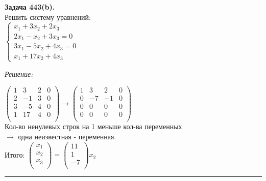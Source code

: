\documentclass[a4paper, 12pt]{article}
\newenvironment{problem}[2][Задача]
{ \begin{mdframed}[backgroundcolor=gray!10] \textbf{#1 #2.} \\}
{  \end{mdframed}}
\newenvironment{solution}
{\textit{Решение: }}
{\noindent\rule{7in}{1.5pt}}
\begin{document}
\begin{problem}{443(b)}
  Решить систему уравнений:\\
  $\left\{\begin{array}{l}
      x_1+3x_2+2x_3\\
      2x_1-x_2+3x_3=0\\
      3x_1-5x_2+4x_3=0\\
      x_1+17x_2+4x_3
  \end{array}\right.$


\end{problem}
\begin{solution}

  $
  \left(
    \begin{array}{rrrrrrrr}
      1 &  3 & 2 & 0 \\
      2 & -1 & 3 & 0 \\
      3 & -5 & 4 & 0 \\
      1 & 17 & 4 & 0 \\
    \end{array}
  \right)
  \rightarrow
  \left(
    \begin{array}{rrrrrrrr}
      1 &   3 &  2 & 0 \\
      0 &  -7 & -1 & 0 \\
      0 &   0 &  0 & 0 \\
      0 &   0 &  0 & 0 \\
    \end{array}
  \right)
  $ \\
Кол-во ненулевых строк на 1 меньше кол-ва переменных \\ $\rightarrow$ одна неизвестная - переменная.
\\
Итого:
$
\left(
  \begin{array}{r}
    x_1 \\
    x_2 \\
    x_3 \\
  \end{array}
\right)
=
\left(
  \begin{array}{r}
   11 \\
    1 \\
   -7 \\
  \end{array}
\right)x_2
$

\end{solution}
\end{document}
